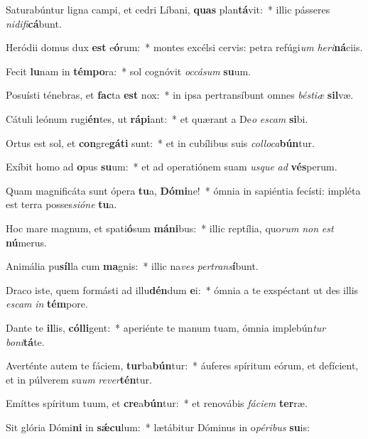 \item Saturabúntur ligna campi, et cedri Líbani, \textbf{quas} plan\textbf{tá}vit:~* illic pásseres \textit{ni}\textit{di}\textit{fi}\textbf{cá}bunt.
\item Heródii domus dux \textbf{est} e\textbf{ó}rum:~* montes excélsi cervis: petra refúgi\textit{um} \textit{he}\textit{ri}\textbf{ná}ciis.
\item Fecit \textbf{lu}nam in \textbf{tém}\textbf{po}ra:~* sol cognóvit \textit{oc}\textit{cá}\textit{sum} \textbf{su}um.
\item Posuísti ténebras, et \textbf{fac}ta \textbf{est} nox:~* in ipsa pertransíbunt omnes \textit{bés}\textit{ti}\textit{æ} \textbf{sil}væ.
\item Cátuli leónum rugi\textbf{én}tes, ut \textbf{rá}\textbf{pi}ant:~* et quærant a De\textit{o} \textit{es}\textit{cam} \textbf{si}bi.
\item Ortus est sol, et \textbf{con}gre\textbf{gá}\textbf{ti} sunt:~* et in cubílibus suis \textit{col}\textit{lo}\textit{ca}\textbf{bún}tur.
\item Exíbit homo ad \textbf{o}pus \textbf{su}um:~* et ad operatiónem suam \textit{us}\textit{que} \textit{ad} \textbf{vés}perum.
\item Quam magnificáta sunt ópera \textbf{tu}a, \textbf{Dó}\textbf{mi}ne!~* ómnia in sapiéntia fecísti: impléta est terra posses\textit{si}\textit{ó}\textit{ne} \textbf{tu}a.
\item Hoc mare magnum, et spati\textbf{ó}sum \textbf{má}\textbf{ni}bus:~* illic reptília, quo\textit{rum} \textit{non} \textit{est} \textbf{nú}merus.
\item Animália pu\textbf{síl}la cum \textbf{ma}gnis:~* illic na\textit{ves} \textit{per}\textit{trans}\textbf{í}bunt.
\item Draco iste, quem formásti ad illu\textbf{dén}dum \textbf{e}i:~* ómnia a te exspéctant ut des illis \textit{es}\textit{cam} \textit{in} \textbf{tém}pore.
\item Dante te \textbf{il}lis, \textbf{cól}\textbf{li}gent:~* aperiénte te manum tuam, ómnia implebún\textit{tur} \textit{bo}\textit{ni}\textbf{tá}te.
\item Averténte autem te fáciem, \textbf{tur}ba\textbf{bún}tur:~* áuferes spíritum eórum, et defícient, et in púlverem su\textit{um} \textit{re}\textit{ver}\textbf{tén}tur.
\item Emíttes spíritum tuum, et \textbf{cre}a\textbf{bún}tur:~* et renovábis \textit{fá}\textit{ci}\textit{em} \textbf{ter}ræ.
\item Sit glória Dómi\textbf{ni} in \textbf{sǽ}\textbf{cu}lum:~* lætábitur Dóminus in o\textit{pé}\textit{ri}\textit{bus} \textbf{su}is:
